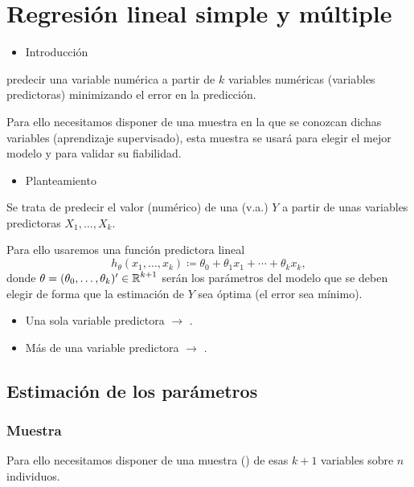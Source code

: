 \section{Regresión lineal simple y múltiple}
\begin{itemize}[label=\color{red}\textbullet, leftmargin=*]
	\item \color{lightblue}Introducción
\end{itemize}
 predecir una variable numérica a partir de $k$ variables numéricas (variables predictoras) minimizando el error en la predicción.

Para ello necesitamos disponer de una muestra en la que se conozcan dichas variables (aprendizaje supervisado), esta muestra se usará para elegir el mejor modelo y para validar su fiabilidad.
\begin{itemize}[label=\color{red}\textbullet, leftmargin=*]
	\item \color{lightblue}Planteamiento
\end{itemize}
Se trata de predecir el valor (numérico) de una \va (v.a.) $Y$ a partir de unas variables predictoras $X_1,\dots,X_k$.

Para ello usaremos una función predictora lineal \[ h_\theta(x_1,\dots,x_k)\coloneq\theta_0+\theta_1x_1+\cdots+\theta_kx_k, \] donde $\theta=(\theta_0,\dots,\theta_k)'\in\operatorname{\mathbb{R}}^{k+1}$ serán los parámetros del modelo que se deben elegir de forma que la estimación de $Y$ sea óptima (el error sea mínimo).
\begin{itemize}[label=\color{lightblue}$\to$]
\item Una sola variable predictora $\longrightarrow$ .
\item Más de una variable predictora $\longrightarrow$ .
\end{itemize}

\subsection{Estimación de los parámetros}
\subsubsection{Muestra}
Para ello necesitamos disponer de una muestra () de esas $k+1$ variables sobre $n$ individuos.

